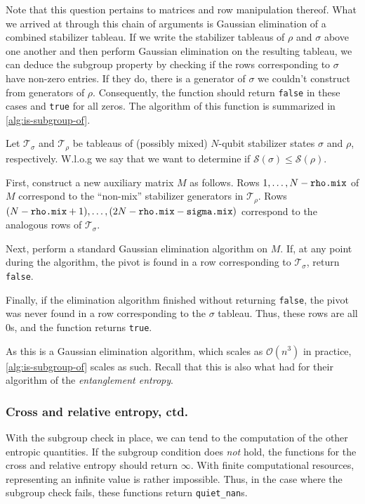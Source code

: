 Note that this question pertains to matrices and row manipulation thereof. What
we arrived at through this chain of arguments is Gaussian elimination of a
combined stabilizer tableau. If we write the stabilizer tableaus of $\rho$ and
$\sigma$ above one another and then perform Gaussian elimination on the
resulting tableau, we can deduce the subgroup property by checking if the rows
corresponding to $\sigma$ have non-zero entries. If they do, there is a
generator of $\sigma$ we couldn't construct from generators of $\rho$.
Consequently, the function should return \verb|false| in these cases and
\verb|true| for all zeros. The algorithm of this function is summarized in
\cref{alg:is-subgroup-of}.
\begin{alg}[Is subgroup of]\label{alg:is-subgroup-of}
  Let $\mathcal{T}_\sigma$ and $\mathcal{T}_\rho$ be tableaus of (possibly
  mixed) $N$-qubit stabilizer states $\sigma$ and $\rho$, respectively. W.l.o.g
  we say that we want to determine if $\mathcal{S}(\sigma)\leq \mathcal{S}(\rho)$.

  First, construct a new auxiliary matrix $M$ as follows. Rows $1, \ldots,
  N-\verb|rho.mix|$ of $M$ correspond to the \enquote{non-mix} stabilizer
  generators in $\mathcal{T}_\rho$. Rows $(N-\verb|rho.mix|+1), \ldots,
  (2N-\verb|rho.mix|-\verb|sigma.mix|)$ correspond to the analogous rows of
  $\mathcal{T}_\sigma$.

  Next, perform a standard Gaussian elimination algorithm on $M$. If, at any
  point during the algorithm, the pivot is found in a row corresponding to
  $\mathcal{T}_\sigma$, return \verb|false|. 

  Finally, if the elimination algorithm finished without returning \verb|false|, the
  pivot was never found in a row corresponding to the $\sigma$ tableau. Thus,
  these rows are all $0$s, and the function returns \verb|true|.
\end{alg}
As this is a Gaussian elimination algorithm, which scales as $\mathcal{O}(n^3)$
in practice, \cref{alg:is-subgroup-of} scales as such. Recall that this is also
what \citeauthor{fattalEntanglementStabilizerFormalism2004} had for their
algorithm of the \emph{entanglement entropy}.
\subsubsection{Cross and relative entropy, ctd.}
With the subgroup check in place, we can tend to the computation of the other
entropic quantities. If the subgroup condition does \emph{not} hold,
the functions for the cross and relative entropy should return
$\infty$. With finite computational resources, representing an infinite value
is rather impossible. Thus, in the case where the subgroup check fails, these
functions return \verb|quiet_nan|s.

